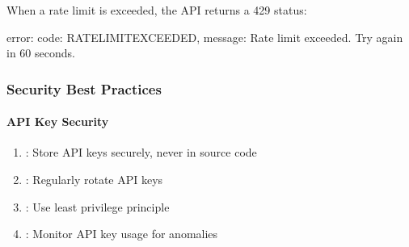 \documentclass[letterpaper,10pt,english]{sphinxmanual}
\begin{document}
\sphinxAtStartPar
{}
When a rate limit is exceeded, the API returns a 429 status:

\begin{sphinxVerbatim}[commandchars=\\\{\}]
  
 
 
 
 

\PYGZob{}
  \PYGZdq{}error\PYGZdq{}: \PYGZob{}
    \PYGZdq{}code\PYGZdq{}: \PYGZdq{}RATE\PYGZus{}LIMIT\PYGZus{}EXCEEDED\PYGZdq{},
    \PYGZdq{}message\PYGZdq{}: \PYGZdq{}Rate limit exceeded. Try again in 60 seconds.\PYGZdq{}
  \PYGZcb{}
\PYGZcb{}
\end{sphinxVerbatim}


\subsubsection{Security Best Practices}
\label{\detokenize{api/authentication:security-best-practices}}

\paragraph{API Key Security}
\label{\detokenize{api/authentication:api-key-security}}\begin{enumerate}
%
\item {} 
\sphinxAtStartPar
{}: Store API keys securely, never in source code

\item {} 
\sphinxAtStartPar
{}: Regularly rotate API keys

\item {} 
\sphinxAtStartPar
{}: Use least privilege principle

\item {} 
\sphinxAtStartPar
{}: Monitor API key usage for anomalies

\end{enumerate}
\end{document}
